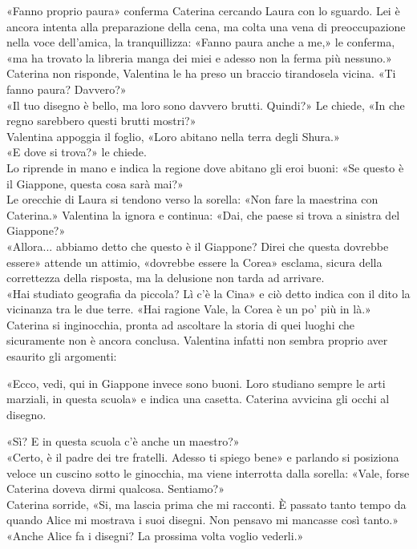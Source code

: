 «Fanno proprio paura» conferma Caterina cercando Laura con lo sguardo. Lei \`e ancora intenta alla preparazione della cena, ma colta una vena di preoccupazione nella voce dell'amica, la tranquillizza: «Fanno paura anche a me,» le conferma, «ma ha trovato la libreria manga dei miei e adesso non la ferma pi\`u nessuno.» \\
Caterina non risponde, Valentina le ha preso un braccio tirandosela vicina. «Ti fanno paura? Davvero?»\\
«Il tuo disegno \`e bello, ma loro sono davvero brutti. Quindi?» Le chiede, «In che regno sarebbero questi brutti mostri?»\\
Valentina appoggia il foglio, «Loro abitano nella terra degli Shura.»\\
«E dove si trova?» le chiede.\\
Lo riprende in mano  e indica la regione dove abitano gli eroi buoni: «Se questo \`e il Giappone, questa cosa sarà mai?»\\
Le orecchie di Laura si tendono verso la sorella: «Non fare la maestrina con Caterina.» Valentina la ignora e continua: «Dai, che paese si trova a sinistra del Giappone?»\\
«Allora... abbiamo detto che questo \`e il Giappone? Direi che questa dovrebbe essere» attende un attimio, «dovrebbe essere la Corea» esclama, sicura della correttezza della risposta, ma la delusione non tarda ad arrivare.\\
«Hai studiato geografia da piccola? Lì c'\`e la Cina» e ciò detto indica con il dito la vicinanza tra le due terre.
«Hai ragione Vale, la Corea \`e un po' pi\`u in l\`a.»
Caterina si inginocchia, pronta ad ascoltare la storia di quei luoghi che sicuramente non \`e ancora conclusa. Valentina infatti non sembra proprio aver esaurito gli argomenti:

«Ecco, vedi, qui in Giappone invece sono buoni. Loro studiano sempre le arti marziali, in questa scuola» e indica una casetta.
Caterina  avvicina gli occhi al disegno.

«Sì? E in questa scuola c’\`e anche un maestro?»\\
«Certo, \`e il padre dei tre fratelli. Adesso ti spiego bene» e parlando si posiziona veloce un cuscino sotto le ginocchia, ma viene interrotta dalla sorella:
«Vale, forse Caterina doveva dirmi qualcosa. Sentiamo?»\\
Caterina sorride,
«Si, ma lascia prima che mi racconti. \`E passato tanto tempo da quando Alice  mi mostrava i suoi disegni. Non pensavo mi mancasse cos\`i tanto.»
\\
«Anche Alice fa i disegni? La prossima volta voglio vederli.»\\

